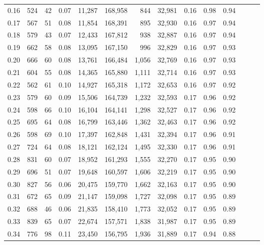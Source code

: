 \begin{tabular}{rrrrrrrrrrrrrr}
0.16 &    524 &     42 &  0.07 &   11,287 &  168,958 &     844 &  32,981 &  0.16 &  0.98 &      0.94 \\
0.17 &    567 &     51 &  0.08 &   11,854 &  168,391 &     895 &  32,930 &  0.16 &  0.97 &      0.94 \\
0.18 &    579 &     43 &  0.07 &   12,433 &  167,812 &     938 &  32,887 &  0.16 &  0.97 &      0.94 \\
0.19 &    662 &     58 &  0.08 &   13,095 &  167,150 &     996 &  32,829 &  0.16 &  0.97 &      0.93 \\
0.20 &    666 &     60 &  0.08 &   13,761 &  166,484 &   1,056 &  32,769 &  0.16 &  0.97 &      0.93 \\
0.21 &    604 &     55 &  0.08 &   14,365 &  165,880 &   1,111 &  32,714 &  0.16 &  0.97 &      0.93 \\
0.22 &    562 &     61 &  0.10 &   14,927 &  165,318 &   1,172 &  32,653 &  0.16 &  0.97 &      0.92 \\
0.23 &    579 &     60 &  0.09 &   15,506 &  164,739 &   1,232 &  32,593 &  0.17 &  0.96 &      0.92 \\
0.24 &    598 &     66 &  0.10 &   16,104 &  164,141 &   1,298 &  32,527 &  0.17 &  0.96 &      0.92 \\
0.25 &    695 &     64 &  0.08 &   16,799 &  163,446 &   1,362 &  32,463 &  0.17 &  0.96 &      0.92 \\
0.26 &    598 &     69 &  0.10 &   17,397 &  162,848 &   1,431 &  32,394 &  0.17 &  0.96 &      0.91 \\
0.27 &    724 &     64 &  0.08 &   18,121 &  162,124 &   1,495 &  32,330 &  0.17 &  0.96 &      0.91 \\
0.28 &    831 &     60 &  0.07 &   18,952 &  161,293 &   1,555 &  32,270 &  0.17 &  0.95 &      0.90 \\
0.29 &    696 &     51 &  0.07 &   19,648 &  160,597 &   1,606 &  32,219 &  0.17 &  0.95 &      0.90 \\
0.30 &    827 &     56 &  0.06 &   20,475 &  159,770 &   1,662 &  32,163 &  0.17 &  0.95 &      0.90 \\
0.31 &    672 &     65 &  0.09 &   21,147 &  159,098 &   1,727 &  32,098 &  0.17 &  0.95 &      0.89 \\
0.32 &    688 &     46 &  0.06 &   21,835 &  158,410 &   1,773 &  32,052 &  0.17 &  0.95 &      0.89 \\
0.33 &    839 &     65 &  0.07 &   22,674 &  157,571 &   1,838 &  31,987 &  0.17 &  0.95 &      0.89 \\
0.34 &    776 &     98 &  0.11 &   23,450 &  156,795 &   1,936 &  31,889 &  0.17 &  0.94 &      0.88 \\

\end{tabular}
